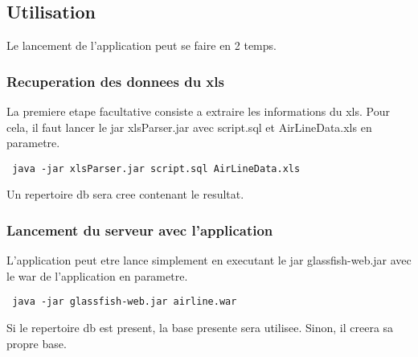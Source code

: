 \subsection{Utilisation}
Le lancement de l'application peut se faire en 2 temps.
\subsubsection{Recuperation des donnees du xls}
La premiere etape facultative consiste a extraire les informations du xls. Pour cela, il faut lancer le jar xlsParser.jar avec script.sql et AirLineData.xls en parametre. 
\begin{verbatim}
 java -jar xlsParser.jar script.sql AirLineData.xls
\end{verbatim}
Un repertoire db sera cree contenant le resultat.
\subsubsection{Lancement du serveur avec l'application}
L'application peut etre lance simplement en executant le jar glassfish-web.jar avec le war de l'application en parametre. 
\begin{verbatim}
 java -jar glassfish-web.jar airline.war
\end{verbatim}
Si le repertoire db est present, la base presente sera utilisee. Sinon, il creera sa propre base.
